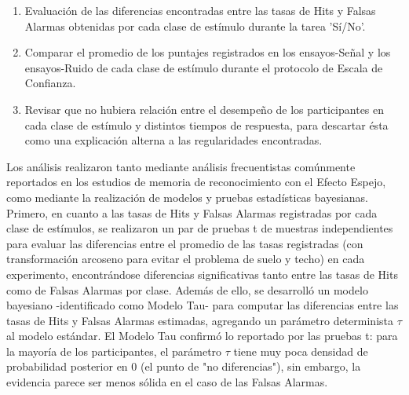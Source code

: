 \begin{enumerate}
	\item Evaluación de las diferencias encontradas entre las tasas de Hits y Falsas Alarmas obtenidas por cada clase de estímulo durante la tarea 'Sí/No'.\\
	\item Comparar el promedio de los puntajes registrados en los ensayos-Señal y los ensayos-Ruido de cada clase de estímulo durante el protocolo de Escala de Confianza.\\
	\item Revisar que no hubiera relación entre el desempeño de los participantes en cada clase de estímulo y distintos tiempos de respuesta, para descartar ésta como una explicación alterna a las regularidades encontradas.\\
\end{enumerate}

Los análisis realizaron tanto mediante análisis frecuentistas comúnmente reportados en los estudios de memoria de reconocimiento con el Efecto Espejo, como mediante la realización de modelos y pruebas estadísticas bayesianas.\\

Primero, en cuanto a las tasas de Hits y Falsas Alarmas registradas por cada clase de estímulos, se realizaron un par de pruebas t de muestras independientes para evaluar las diferencias entre el promedio de las tasas registradas (con transformación arcoseno para evitar el problema de suelo y techo) en cada experimento, encontrándose diferencias significativas tanto entre las tasas de Hits como de Falsas Alarmas por clase. Además de ello, se desarrolló un modelo bayesiano -identificado como Modelo Tau- para computar las diferencias entre las tasas de Hits y Falsas Alarmas estimadas, agregando un parámetro determinista $\tau$ al modelo estándar. El Modelo Tau confirmó lo reportado por las pruebas t: para la mayoría de los participantes, el parámetro $\tau$ tiene muy poca densidad de probabilidad posterior en $0$ (el punto de "no diferencias"), sin embargo, la evidencia parece ser menos sólida en el caso de las Falsas Alarmas. \\ %

